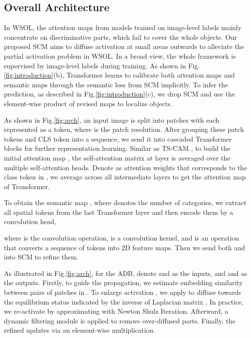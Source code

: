 \documentclass[runningheads]{llncs}
\begin{document}
\subsection{Overall Architecture}
In WSOL, the attention maps from models trained on image-level labels mainly concentrate on discriminative parts, which fail to cover the whole objects.
Our proposed SCM aims to diffuse activation at small areas outwards to alleviate the partial activation problem in WSOL.
In a broad view, the whole framework is supervised by image-level labels during training. As shown in Fig.\ref{fig:introduction}(b), Transformer learns to calibrate both attention maps and semantic maps through the semantic loss from SCM implicitly. To infer the prediction, as described in Fig.\ref{fig:introduction}(c), we drop SCM and use the element-wise product of revised maps to localize objects.

As shown in Fig.\ref{fig:arch}, an input image is split into  patches with each represented as a token, where  is the patch resolution.
After grouping these patch tokens and CLS token into a sequence, we send it into  cascaded Transformer blocks for further representation learning. 
Similar as TS-CAM \cite{gao2021tscam}, to build the initial attention map , 
the self-attention matrix  at  layer is averaged over the multiple self-attention heads.
Denote  as attention weights that corresponds to the class token in ,
we average  across all intermediate layers to get the attention map  of Transformer.

To obtain the semantic map , where  denotes the number of categories, we extract all spatial tokens   from the last Transformer layer 
and then encode them by a convolution head,

where  is the convolution operation,  is a  convolution kernel, and  is an operation that converts a sequence of tokens into 2D feature maps. Then we send both   and  into SCM to refine them. 

As illustrated in Fig.\ref{fig:arch}, for the  ADB, denote  and  as the inputs, and  and  as the outputs. 
Firstly, to guide the propagation, we estimate embedding similarity  between pairs of patches in . 
To enlarge activation , we apply  to diffuse  towards the equilibrium status indicated by the inverse of Laplacian matrix . 
In practice, we re-activate  by approximating  with Newton Shulz Iteration. 
Afterward, a dynamic filtering module is applied to remove over-diffused parts. 
Finally, the refined  updates  via an element-wise multiplication. 
\end{document}
